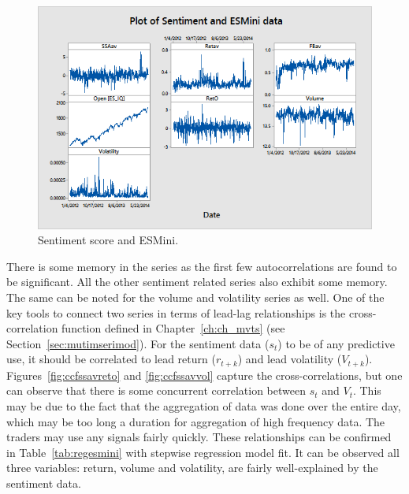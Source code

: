 	\begin{figure}[!ht]
	\centering
	\includegraphics[width=\textwidth]{chapters/chapter_news_an/figures/ch4sec4sentimentesmini} 
	\caption{Sentiment score and ESMini. \label{fig:sentimentesmini}}
	\end{figure}

There is some memory in the series as the first few autocorrelations are found to be significant. All the other sentiment related series also exhibit some memory. The same can be noted for the volume and volatility series as well. One of the key tools to connect two series in terms of lead-lag relationships is the cross-correlation function defined in Chapter~\ref{ch:ch_mvts} (see Section~\ref{sec:mutimserimod}). For the sentiment data ($s_t$) to be of any predictive use, it should be correlated to lead return ($r_{t+k}$) and lead volatility ($V_{t+k}$). Figures~\ref{fig:ccfssavreto} and \ref{fig:ccfssavvol} capture the cross-correlations, but one can observe that there is some concurrent correlation between $s_t$ and $V_t$. This may be due to the fact that the aggregation of data was done over the entire day, which may be too long a duration for aggregation of high frequency data. The traders may use any signals fairly quickly. These relationships can be confirmed in Table~\ref{tab:regesmini} with stepwise regression model fit. It can be observed all three variables: return, volume and volatility, are fairly well-explained by the sentiment data. 


